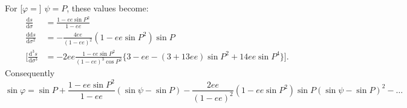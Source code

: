 \noindent For [\(\varphi=\)] \(\psi=P\), these values become:
\[
\begin{aligned}
\frac{\mathrm ds}{\mathrm d\sigma}
&=\frac{1-ee\sin P^2}{1-ee}\\
\frac{\mathrm{dd}s}{\mathrm d\sigma^2}
&=-\frac{4ee}{(1-ee)^2}(1-ee\sin P^2)\sin P\\
\mathopen{\Big[}\frac{\mathrm d^3s}{\mathrm d\sigma^3}
&=-2ee\frac{1-ee\sin P^2}{(1-ee)^3\cos P^2}
\{3-ee-(3+13ee)\sin P^2+14ee\sin P^4\}\Big].
\end{aligned}
\]
\noindent Consequently
\[
\sin\varphi=\sin P+\frac{1-ee\sin P^2}{1-ee}(\sin\psi-\sin P)
-\frac{2ee}{(1-ee)^2}(1-ee\sin P^2)\sin P(\sin\psi-\sin P)^2-\ldots
\]

\par\clearpage
\noindent\makebox[12mm][l]{}\par\medskip

